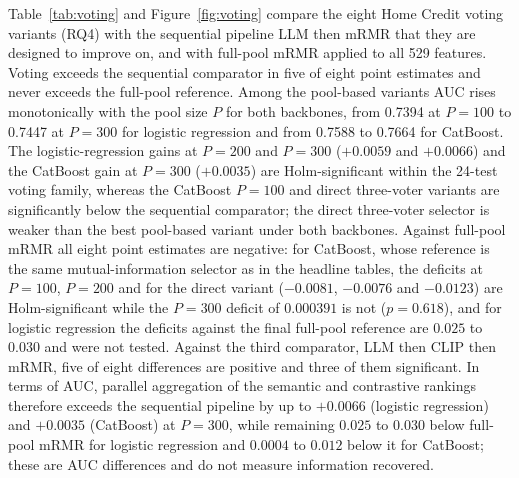 \documentclass[final,5p,twocolumn]{elsarticle}
\begin{document}
Table~\ref{tab:voting} and Figure~\ref{fig:voting} compare the eight Home Credit voting variants (RQ4) with the sequential pipeline LLM then mRMR that they are designed to improve on, and with full-pool mRMR applied to all 529 features. Voting exceeds the sequential comparator in five of eight point estimates and never exceeds the full-pool reference. Among the pool-based variants AUC rises monotonically with the pool size $P$ for both backbones, from 0.7394 at $P=100$ to 0.7447 at $P=300$ for logistic regression and from 0.7588 to 0.7664 for CatBoost. The logistic-regression gains at $P=200$ and $P=300$ ($+0.0059$ and $+0.0066$) and the CatBoost gain at $P=300$ ($+0.0035$) are Holm-significant within the 24-test voting family, whereas the CatBoost $P=100$ and direct three-voter variants are significantly below the sequential comparator; the direct three-voter selector is weaker than the best pool-based variant under both backbones. Against full-pool mRMR all eight point estimates are negative: for CatBoost, whose reference is the same mutual-information selector as in the headline tables, the deficits at $P=100$, $P=200$ and for the direct variant ($-0.0081$, $-0.0076$ and $-0.0123$) are Holm-significant while the $P=300$ deficit of $0.000391$ is not ($p=0.618$), and for logistic regression the deficits against the final full-pool reference are $0.025$ to $0.030$ and were not tested. Against the third comparator, LLM then CLIP then mRMR, five of eight differences are positive and three of them significant. In terms of AUC, parallel aggregation of the semantic and contrastive rankings therefore exceeds the sequential pipeline by up to $+0.0066$ (logistic regression) and $+0.0035$ (CatBoost) at $P=300$, while remaining $0.025$ to $0.030$ below full-pool mRMR for logistic regression and $0.0004$ to $0.012$ below it for CatBoost; these are AUC differences and do not measure information recovered.
\end{document}
